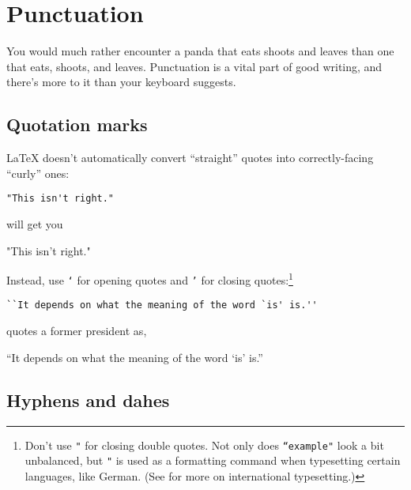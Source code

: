 \chapter{Punctuation}
\label{punctuation}

You would much rather encounter a panda that eats
shoots and leaves than one that eats, shoots,
and leaves.\punckern{}
Punctuation is a vital part of good writing,
and there's more to it than your keyboard suggests.

\section{Quotation marks}

\LaTeX{} doesn't automatically convert ``straight'' quotes
into correctly-facing ``curly'' ones:
\begin{leftfigure}
\begin{lstlisting}
"This isn't right."
\end{lstlisting}
\end{leftfigure}
will get you
\begin{leftfigure}
\lm%
"This isn't right."
\end{leftfigure}
Instead, use \texttt{`} for opening quotes and \texttt{'} for closing
quotes:\footnote{Don't use \texttt{"} for closing double quotes.
Not only does \texttt{``example"} look a bit unbalanced,
but \texttt{"} is used as a formatting command when typesetting certain
languages, like German. (See  for more on international
typesetting.)}
\begin{leftfigure}
\begin{lstlisting}
``It depends on what the meaning of the word `is' is.''
\end{lstlisting}
\end{leftfigure}
quotes a former  president as,
\begin{leftfigure}
\lm%
``It depends on what the meaning of the word `is' is.''
\end{leftfigure}

\section{Hyphens and dahes}

